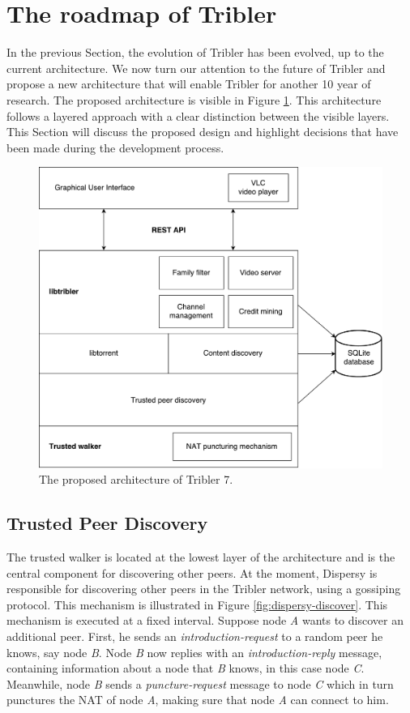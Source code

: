 \section{The roadmap of Tribler}
In the previous Section, the evolution of Tribler has been evolved, up to the current architecture. We now turn our attention to the future of Tribler and propose a new architecture that will enable Tribler for another 10 year of research. The proposed architecture is visible in Figure \ref{fig:tribler7}. This architecture follows a layered approach with a clear distinction between the visible layers. This Section will discuss the proposed design and highlight decisions that have been made during the development process.

\begin{figure}[h!]
	\centering
	\includegraphics[width=0.7\columnwidth]{images/architecture/tribler7}
	\caption{The proposed architecture of Tribler 7.}
	\label{fig:tribler7}
\end{figure}

\subsection{Trusted Peer Discovery}
The trusted walker is located at the lowest layer of the architecture and is the central component for discovering other peers. At the moment, Dispersy is responsible for discovering other peers in the Tribler network, using a gossiping protocol\cite{zeilemaker2013dispersy}. This mechanism is illustrated in Figure \ref{fig:dispersy-discover}. This mechanism is executed at a fixed interval. Suppose node \emph{A} wants to discover an additional peer. First, he sends an \emph{introduction-request} to a random peer he knows, say node \emph{B}. Node \emph{B} now replies with an \emph{introduction-reply} message, containing information about a node that \emph{B} knows, in this case node \emph{C}. Meanwhile, node \emph{B} sends a \emph{puncture-request} message to node \emph{C} which in turn punctures the NAT of node \emph{A}, making sure that node \emph{A} can connect to him.\\

